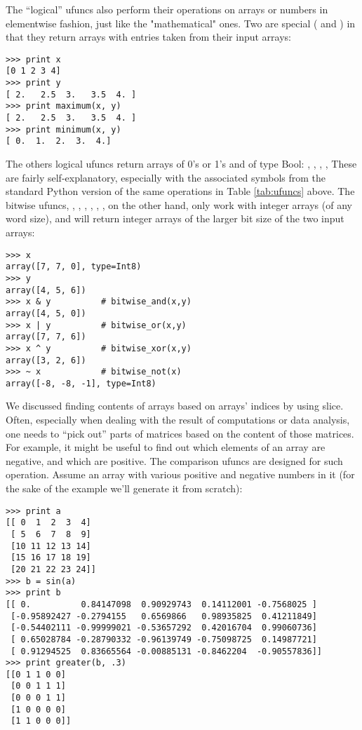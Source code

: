 The ``logical'' ufuncs also perform their operations on arrays or numbers 
in elementwise fashion, just like the "mathematical" ones.  Two are special
( and ) in that they return arrays with
entries taken from their input arrays:
\begin{verbatim}
>>> print x
[0 1 2 3 4]
>>> print y
[ 2.   2.5  3.   3.5  4. ]
>>> print maximum(x, y)
[ 2.   2.5  3.   3.5  4. ]
>>> print minimum(x, y)
[ 0.  1.  2.  3.  4.]
\end{verbatim}
The others logical ufuncs return arrays of 0's or 1's and of type Bool:
, , ,
, 
These are fairly
self-explanatory, especially with the associated symbols from the standard
Python version of the same operations in Table \ref{tab:ufuncs} above. 
The bitwise ufuncs,
, ,
, ,  
, ,  
on the other hand, only work with integer arrays (of any word size), and
will return integer arrays of the larger bit size of the two input arrays:
\begin{verbatim}
>>> x
array([7, 7, 0], type=Int8)
>>> y
array([4, 5, 6])
>>> x & y          # bitwise_and(x,y)
array([4, 5, 0])
>>> x | y          # bitwise_or(x,y)
array([7, 7, 6])   
>>> x ^ y          # bitwise_xor(x,y)
array([3, 2, 6]) 
>>> ~ x            # bitwise_not(x)
array([-8, -8, -1], type=Int8)

\end{verbatim}
We discussed finding contents of arrays based on arrays' indices by using slice.
Often, especially when dealing with the result of computations or data
analysis, one needs to ``pick out'' parts of matrices based on the content of
those matrices. For example, it might be useful to find out which elements of
an array are negative, and which are positive. The comparison ufuncs are
designed for such operation. Assume an array with various positive
and negative numbers in it (for the sake of the example we'll generate it from
scratch):
\begin{verbatim}
>>> print a
[[ 0  1  2  3  4]
 [ 5  6  7  8  9]
 [10 11 12 13 14]
 [15 16 17 18 19]
 [20 21 22 23 24]]
>>> b = sin(a)
>>> print b
[[ 0.          0.84147098  0.90929743  0.14112001 -0.7568025 ]
 [-0.95892427 -0.2794155   0.6569866   0.98935825  0.41211849]
 [-0.54402111 -0.99999021 -0.53657292  0.42016704  0.99060736]
 [ 0.65028784 -0.28790332 -0.96139749 -0.75098725  0.14987721]
 [ 0.91294525  0.83665564 -0.00885131 -0.8462204  -0.90557836]]
>>> print greater(b, .3)
[[0 1 1 0 0]
 [0 0 1 1 1]
 [0 0 0 1 1]
 [1 0 0 0 0]
 [1 1 0 0 0]]
\end{verbatim}


